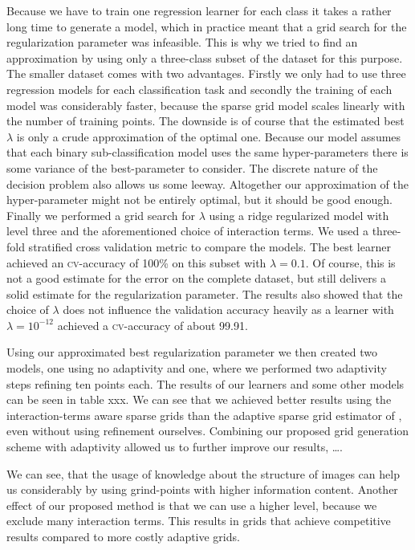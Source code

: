 Because we have to train one regression learner for each class it takes a rather
long time to generate a model, which in practice meant that a grid search for
the regularization parameter was infeasible.
This is why we tried to find an approximation by using only a three-class subset
of the dataset for this purpose.
The smaller dataset comes with two advantages.
Firstly we only had to use three regression models for each classification
task and secondly the training of each model was considerably faster, because
the sparse grid model scales linearly with the number of training points.
The downside is of course that the estimated best \(\lambda\) is only a crude
approximation of the optimal one.
Because our model assumes that each binary sub-classification model uses the
same hyper-parameters there is some variance of the best-parameter to consider.
The discrete nature of the decision problem also allows us some leeway.
Altogether our approximation of the hyper-parameter might not be entirely
optimal, but it should be good enough.
Finally we performed a grid search for \(\lambda\) using a ridge regularized model with level
three and the aforementioned choice of interaction terms.
We used a three-fold stratified cross validation metric to compare the models.
The best learner achieved an \textsc{cv}-accuracy of 100\% on this subset with
\(\lambda = 0.1\).
Of course, this is not a good estimate for the error on the complete dataset,
but still delivers a solid estimate for the regularization parameter.
The results also showed that the choice of \(\lambda\) does not influence the
validation accuracy heavily as a learner with \(\lambda = 10^{-12}\) achieved a
\textsc{cv}-accuracy of about 99.91.

Using our approximated best regularization parameter we then created two models,
one using no adaptivity and one, where we performed two adaptivity steps
refining ten points each.
The results of our learners and some other models can be seen in table xxx.
We can see that we achieved better results using the interaction-terms aware
sparse grids than the adaptive sparse grid estimator of \cite{spatAdaptGrid},
even without using refinement ourselves.
Combining our proposed grid generation scheme with adaptivity allowed us to
further improve our results, \ldots.

We can see, that the usage of knowledge about the structure of images can help
us considerably by using grind-points with higher information content.
Another effect of our proposed method is that we can use a higher level, because
we exclude many interaction terms.
This results in grids that achieve competitive results compared to more costly
adaptive grids.

